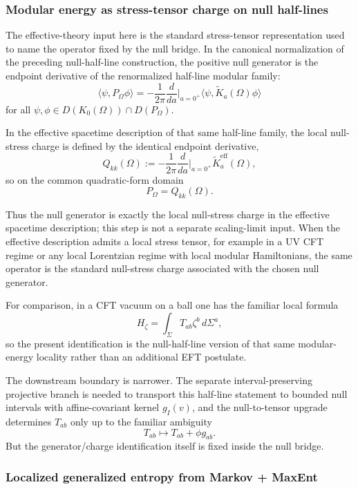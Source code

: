 \subsubsection{Modular energy as stress-tensor charge on null half-lines}\label{53-modular-energy-as-stress-tensor-charge-uv-cft}

The effective-theory input here is the standard stress-tensor representation used to name the operator fixed by the null bridge. In the canonical normalization of the preceding null-half-line construction, the positive null generator is the endpoint derivative of the renormalized half-line modular family:
\[
\langle\psi,P_\Omega\phi\rangle
=
-\frac{1}{2\pi}\frac{d}{da}\Big|_{a=0^+}
\langle\psi,\widetilde K_a(\Omega)\phi\rangle
\]
for all \(\psi,\phi\in D(K_0(\Omega))\cap D(P_\Omega)\).

In the effective spacetime description of that same half-line family, the local null-stress charge is defined by the identical endpoint derivative,
\[
Q_{kk}(\Omega)
:=
-\frac{1}{2\pi}\frac{d}{da}\Big|_{a=0^+}\widetilde K^{\mathrm{eff}}_a(\Omega),
\]
so on the common quadratic-form domain
\[
P_\Omega = Q_{kk}(\Omega).
\]

Thus the null generator is exactly the local null-stress charge in the effective spacetime description; this step is not a separate scaling-limit input. When the effective description admits a local stress tensor, for example in a UV CFT regime or any local Lorentzian regime with local modular Hamiltonians, the same operator is the standard null-stress charge associated with the chosen null generator.

For comparison, in a CFT vacuum on a ball one has the familiar local formula
\[
H_{\zeta}=\int_{\Sigma}T_{ab}\zeta^b\,d\Sigma^a,
\]
so the present identification is the null-half-line version of that same modular-energy locality rather than an additional EFT postulate.

The downstream boundary is narrower. The separate interval-preserving projective branch is needed to transport this half-line statement to bounded null intervals with affine-covariant kernel \(g_I(v)\), and the null-to-tensor upgrade determines \(T_{ab}\) only up to the familiar ambiguity
\[
T_{ab}\mapsto T_{ab}+\phi g_{ab}.
\]
But the generator/charge identification itself is fixed inside the null bridge.

\subsubsection{Localized generalized entropy from Markov + MaxEnt}\label{54-localized-generalized-entropy-from-markov--maxent}

